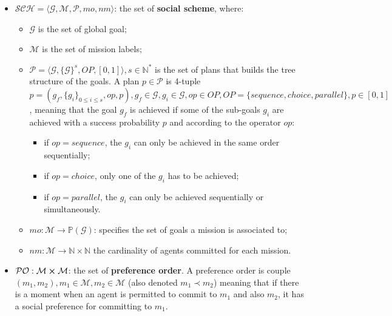 \documentclass{ecai}
\begin{document}
\begin{itemize}
    \item $\mathcal{SCH} = \langle\mathcal{G}, \mathcal{M}, \mathcal{P}, mo, nm \rangle$: the set of \textbf{social scheme}, where:
          \begin{itemize}
              \item $\mathcal{G}$ is the set of global goal;

              \item $\mathcal{M}$ is the set of mission labels;
              \item $\mathcal{P} = \langle \mathcal{G}, \{\mathcal{G}\}^s, OP, [0,1] \rangle, s \in \mathbb{N}^*$ is the set of plans that builds the tree structure of the goals.
              A plan $p \in \mathcal{P}$ is 4-tuple $p=(g_f,\{g_i\}_{0 \leq i \leq s}, op, p), g_f \in \mathcal{G}, g_i \in \mathcal{G}, op \in OP, OP = \{sequence, choice, parallel\}, p \in [0,1]$, meaning that the goal $g_f$ is achieved if some of the sub-goals $g_i$ are achieved with a success probability $p$ and according to the operator $op$:
              \begin{itemize}
                \item if $op = sequence$, the $g_i$ can only be achieved in the same order sequentially;
                \item if $op = choice$, only one of the $g_i$ has to be achieved;
                \item if $op = parallel$, the $g_i$ can only be achieved sequentially or simultaneously.
              \end{itemize}

              \item $mo: \mathcal{M} \rightarrow \mathbb{P}(\mathcal{G})$: specifies the set of goals a mission is associated to;
              \item $nm: \mathcal{M} \rightarrow \mathbb{N} \times \mathbb{N}$ the cardinality of agents committed for each mission.
          \end{itemize}
    \item $\mathcal{PO}: \mathcal{M} \cross \mathcal{M}$: the set of \textbf{preference order}. A preference order is couple $(m_1, m_2), m_1 \in \mathcal{M}, m_2 \in \mathcal{M}$ (also denoted $m_{1} \prec m_{2}$) meaning that if there is a moment when an agent is permitted to commit to $m_{1}$ and also $m_{2}$, it has a social preference for committing to $m_{1}$.
\end{itemize}
\end{document}
